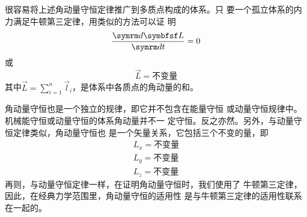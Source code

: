 很容易将上述角动量守恒定律推广到多质点构成的体系。只
要一个孤立体系的内力满足牛顿第三定律，用类似的方法可以证
明
\begin{equation*}
  \frac { \dif \vec{L} } { \dif t } = 0
\end{equation*}
或%
\begin{equation}\label{eqn:09.01.11}
  \vec{L}=\text{不变量}
\end{equation}
其中$\displaystyle \vec{L}=\sum_{i=1}^{n} \vec{l}_i$，是体系中各质点的角动量的和。

角动量守恒也是一个独立的规律，即它并不包含在能量守恒
或动量守恒规律中。机械能守恒或动量守恒的体系角动量并不一
定守恒。反之亦然。另外，与动量守恒定律类似，角动量守恒也
是一个矢量关系，它包括三个不变的量，即
\begin{equation}\label{eqn:09.01.12}
  \begin{aligned}
    L _ { x } = \text{不变量} \\
    L _ { y } = \text{不变量} \\
    L _ { z } = \text{不变量}
  \end{aligned}
\end{equation}
再则，与动量守恒定律一样，在证明角动量守恒时，我们使用了
牛顿第三定律，因此，在经典力学范围里，角动量守恒的适用性
是与牛顿第三定律的适用性联系在一起的。
